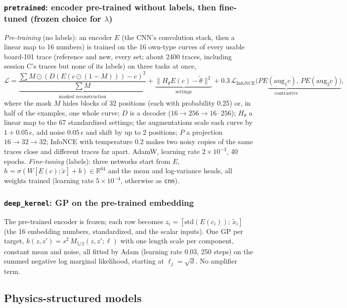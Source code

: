 \subsubsection{\texttt{pretrained}: encoder pre-trained without labels, then fine-tuned (frozen choice for $\lambda$)}
\emph{Pre-training} (no labels): an encoder $E$ (the CNN's convolution stack, then a linear map to 16 numbers) is
trained on the 16 own-type curves of every usable board-101 trace (reference and new, every set; about 2400 traces,
including session C's traces but none of its labels) on three tasks at once,
\[
\mathcal L=\underbrace{\frac{\sum M\odot(D(E(c\odot(1-M)))-c)^2}{\sum M}}_{\text{masked reconstruction}}
+\underbrace{\big\|H_\theta E(c)-\tilde\theta\big\|^2}_{\text{settings}}
+0.3\,\underbrace{\mathcal L_{\text{InfoNCE}}\big(P E(\text{aug}_1 c),\,P E(\text{aug}_2 c)\big)}_{\text{contrastive}},
\]
where the mask $M$ hides blocks of 32 positions (each with probability 0.25) or, in half of the examples, one whole
curve; $D$ is a decoder ($16\to256\to16{\cdot}256$); $H_\theta$ a linear map to the 67 standardized settings; the
augmentations scale each curve by $1+0.05\,\epsilon$, add noise $0.05\,\epsilon$ and shift by up to 2 positions; $P$ a
projection $16\to32\to32$; InfoNCE with temperature 0.2 makes two noisy copies of the same traces close and different
traces far apart. AdamW, learning rate $2\times10^{-3}$, 40 epochs. \emph{Fine-tuning} (labels): three networks start
from $E$, $h=\sigma(W[E(c);\tilde x]+b)\in\mathbb R^{64}$ and the mean and log-variance heads, all weights trained
(learning rate $5\times10^{-4}$, otherwise as \texttt{cnn}).


\subsubsection{\texttt{deep\_kernel}: GP on the pre-trained embedding}
The pre-trained encoder is frozen; each row becomes $z_i=[\text{std}(E(c_i));\,\tilde x_i]$ (the 16 embedding numbers,
standardized, and the scalar inputs). One GP per target, $k(z,z')=s^2\,M_{5/2}(z,z';\ell)$ with one length scale per
component, constant mean and noise, all fitted by Adam (learning rate 0.03, 250 steps) on the summed negative log
marginal likelihood, starting at $\ell_j=\sqrt d$. No amplifier term.


\subsection{Physics-structured models}

